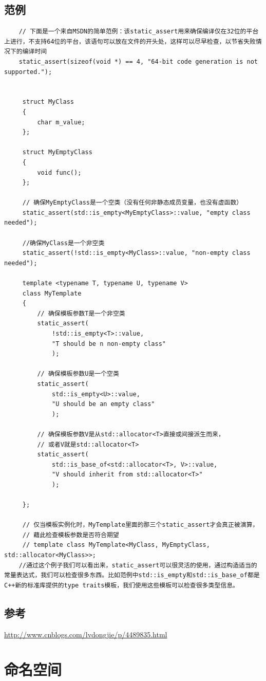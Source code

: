 \documentclass[UTF8,a4paper,12pt]{ctexbook} %
\begin{document}
\section{范例}
	\begin{lstlisting}
	// 下面是一个来自MSDN的简单范例：该static_assert用来确保编译仅在32位的平台上进行，不支持64位的平台，该语句可以放在文件的开头处，这样可以尽早检查，以节省失败情况下的编译时间
	static_assert(sizeof(void *) == 4, "64-bit code generation is not supported.");
	
	
	 struct MyClass
	 {
	     char m_value;
	 };
	  
	 struct MyEmptyClass
	 {
	     void func();
	 };
	  
	 // 确保MyEmptyClass是一个空类（没有任何非静态成员变量，也没有虚函数）
	 static_assert(std::is_empty<MyEmptyClass>::value, "empty class needed");
	  
	 //确保MyClass是一个非空类
	 static_assert(!std::is_empty<MyClass>::value, "non-empty class needed");
	  
	 template <typename T, typename U, typename V>
	 class MyTemplate
	 {
	     // 确保模板参数T是一个非空类
	     static_assert(
	         !std::is_empty<T>::value,
	         "T should be n non-empty class"
	         );
	  
	     // 确保模板参数U是一个空类
	     static_assert(
	         std::is_empty<U>::value,
	         "U should be an empty class"
	         );
	  
	     // 确保模板参数V是从std::allocator<T>直接或间接派生而来，
	     // 或者V就是std::allocator<T>
	     static_assert(
	         std::is_base_of<std::allocator<T>, V>::value,
	         "V should inherit from std::allocator<T>"
	         );
  
	 };
	  
	 // 仅当模板实例化时，MyTemplate里面的那三个static_assert才会真正被演算，
	 // 藉此检查模板参数是否符合期望
	 // template class MyTemplate<MyClass, MyEmptyClass, std::allocator<MyClass>>;
	//通过这个例子我们可以看出来，static_assert可以很灵活的使用，通过构造适当的常量表达式，我们可以检查很多东西。比如范例中std::is_empty和std::is_base_of都是C++新的标准库提供的type traits模板，我们使用这些模板可以检查很多类型信息。
	\end{lstlisting}

\section{参考}
	\url{http://www.cnblogs.com/lvdongjie/p/4489835.html}
\chapter{命名空间}
\end{document}
